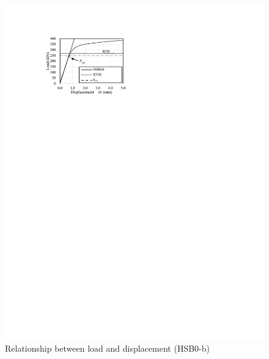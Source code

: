 \begin{figure}[htbp]
\begin{minipage}[t]{0.48\textwidth}
    \includegraphics{imgs/ch4/ld-htb0b.pdf}
    \caption{Relationship between load and displacement (HSB0-b)}
    \label{fig-ld-htb0b}
    \end{minipage}
    \begin{minipage}[t]{0.48\textwidth}

\end{minipage}
\end{figure}
